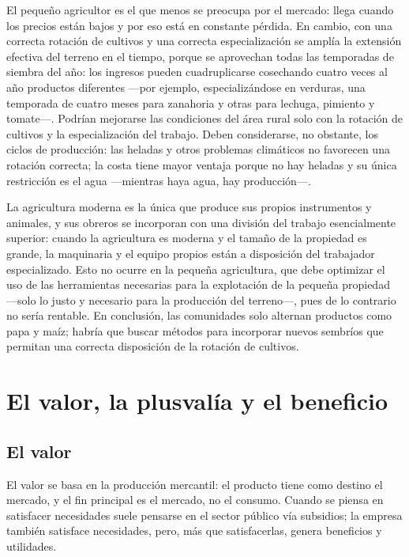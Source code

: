 \documentclass[
  man,
  floatsintext,
  longtable,
  a4paper,
  nolmodern,
  notxfonts,
  notimes,
  12pt,
  colorlinks=true,linkcolor=blue,citecolor=blue,urlcolor=blue]{apa7}
\begin{document}
El pequeño agricultor es el que menos se preocupa por el mercado: llega
cuando los precios están bajos y por eso está en constante pérdida. En
cambio, con una correcta rotación de cultivos y una correcta
especialización se amplía la extensión efectiva del terreno en el
tiempo, porque se aprovechan todas las temporadas de siembra del año:
los ingresos pueden cuadruplicarse cosechando cuatro veces al año
productos diferentes ---por ejemplo, especializándose en verduras, una
temporada de cuatro meses para zanahoria y otras para lechuga, pimiento
y tomate---. Podrían mejorarse las condiciones del área rural solo con
la rotación de cultivos y la especialización del trabajo. Deben
considerarse, no obstante, los ciclos de producción: las heladas y otros
problemas climáticos no favorecen una rotación correcta; la costa tiene
mayor ventaja porque no hay heladas y su única restricción es el agua
---mientras haya agua, hay producción---.

La agricultura moderna es la única que produce sus propios instrumentos
y animales, y sus obreros se incorporan con una división del trabajo
esencialmente superior: cuando la agricultura es moderna y el tamaño de
la propiedad es grande, la maquinaria y el equipo propios están a
disposición del trabajador especializado. Esto no ocurre en la pequeña
agricultura, que debe optimizar el uso de las herramientas necesarias
para la explotación de la pequeña propiedad ---solo lo justo y necesario
para la producción del terreno---, pues de lo contrario no sería
rentable. En conclusión, las comunidades solo alternan productos como
papa y maíz; habría que buscar métodos para incorporar nuevos sembríos
que permitan una correcta disposición de la rotación de cultivos.

\section{El valor, la plusvalía y el
beneficio}\label{el-valor-la-plusvaluxeda-y-el-beneficio}

\subsection{El valor}\label{el-valor}

El valor se basa en la producción mercantil: el producto tiene como
destino el mercado, y el fin principal es el mercado, no el consumo.
Cuando se piensa en satisfacer necesidades suele pensarse en el sector
público vía subsidios; la empresa también satisface necesidades, pero,
más que satisfacerlas, genera beneficios y utilidades.
\end{document}
